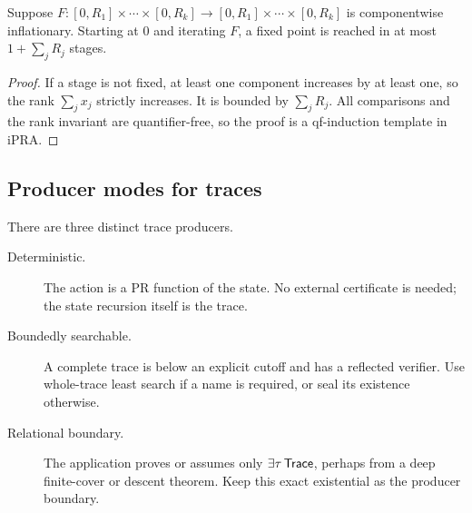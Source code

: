 \begin{proposition}
Suppose \(F:[0,R_1]\times\cdots\times[0,R_k]\to
[0,R_1]\times\cdots\times[0,R_k]\) is componentwise inflationary.  Starting
at \(0\) and iterating \(F\), a fixed point is reached in at most
\(1+\sum_j R_j\) stages.
\end{proposition}

\begin{proof}
If a stage is not fixed, at least one component increases by at least one, so
the rank \(\sum_j x_j\) strictly increases.  It is bounded by
\(\sum_jR_j\).  All comparisons and the rank invariant are quantifier-free,
so the proof is a qf-induction template in iPRA.
\end{proof}

\subsection{Producer modes for traces}

There are three distinct trace producers.
\begin{description}
\item[Deterministic.]  The action is a PR function of the state.  No external
certificate is needed; the state recursion itself is the trace.
\item[Boundedly searchable.]  A complete trace is below an explicit cutoff and
has a reflected verifier.  Use whole-trace least search if a name is required,
or seal its existence otherwise.
\item[Relational boundary.]  The application proves or assumes only
\(\exists\tau\,\mathsf{Trace}\), perhaps from a deep finite-cover or descent theorem.
Keep this exact existential as the producer boundary.
\end{description}
